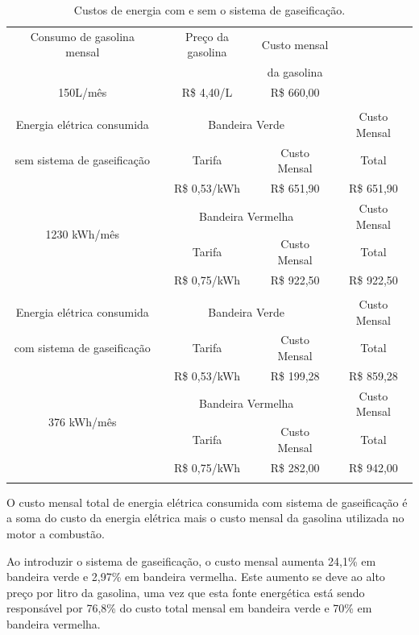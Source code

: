 \begin{table}[h]
	\centering
	\caption{Custos de energia com e sem o sistema de gaseificação.}
	\begin{tabular}{|c|c|c|c|}
		\hline
		Consumo de gasolina mensal & Preço da gasolina & Custo mensal &\\
		& & da gasolina & \\
		150L/mês & R\$ 4,40/L & R\$ 660,00 &\\
		\hline
		\rowcolor{gray} \multicolumn{4}{|c|}{} \\
		\hline
		Energia elétrica consumida & \multicolumn{2}{c|}{Bandeira Verde}  & Custo Mensal\\
		\cline{2-3}
		sem sistema de gaseificação &  Tarifa & Custo Mensal & Total\\
		\multirow{4}{*}{1230 kWh/mês} & R\$ 0,53/kWh &  R\$ 651,90 & \cellcolor{lightgray} R\$ 651,90 \\
		\cline{2-4}
		& \multicolumn{2}{c|}{Bandeira Vermelha}  & Custo Mensal\\
		\cline{2-3}
		& Tarifa  & Custo Mensal & Total\\
		& R\$ 0,75/kWh &  R\$ 922,50 & \cellcolor{lightgray} R\$ 922,50 \\
		\hline
		\rowcolor{gray} \multicolumn{4}{|c|}{} \\
		\hline
		Energia elétrica consumida & \multicolumn{2}{c|}{Bandeira Verde}  & Custo Mensal \\
		\cline{2-3}
		com sistema de gaseificação & Tarifa  & Custo Mensal & Total\\
		\multirow{4}{*}{376 kWh/mês} & R\$ 0,53/kWh & R\$ 199,28 & \cellcolor{lightgray} R\$ 859,28\\
		\cline{2-4}
		& \multicolumn{2}{c|}{Bandeira Vermelha}  & Custo Mensal\\
		\cline{2-3}
		& Tarifa  & Custo Mensal &  Total \\
		& R\$ 0,75/kWh & R\$ 282,00 & \cellcolor{lightgray}R\$ 942,00\\
		\hline
		\rowcolor{gray} \multicolumn{4}{|c|}{} \\
		\hline
	\end{tabular}
	\label{custos_finais}
\end{table}	

O custo mensal total de energia elétrica consumida com sistema de gaseificação é a soma do custo da energia elétrica mais o custo mensal da gasolina utilizada no motor a combustão.

Ao introduzir o sistema de gaseificação, o custo mensal aumenta 24,1\% em bandeira verde e 2,97\% em bandeira vermelha. Este aumento se deve ao alto preço por litro da gasolina, uma vez que esta fonte energética está sendo responsável por 76,8\% do custo total mensal em bandeira verde e 70\% em bandeira vermelha.

